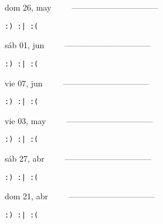 \documentclass[letterpaper,10pt]{article}
\begin{document}
\begin{multicols}{3}
{dom 26, may\ \ \ \ \ --------------------------------}
\begin{flushright}\begin{small}\texttt{:) :| :(}\end{small}\end{flushright}
\vfill
{sáb 01, jun\ \ \ \ \ --------------------------------}
\begin{flushright}\begin{small}\texttt{:) :| :(}\end{small}\end{flushright}\par
\vfill
{vie 07, jun\ \ \ \ \ --------------------------------}
\begin{flushright}\begin{small}\texttt{:) :| :(}\end{small}\end{flushright}\par
\vfill
\end{multicols}
\vspace{1.05cm}

\begin{multicols}{3}
{vie 03, may\ \ \ \ \ --------------------------------}
\begin{flushright}\begin{small}\texttt{:) :| :(}\end{small}\end{flushright}
\vfill
{sáb 27, abr\ \ \ \ \ --------------------------------}
\begin{flushright}\begin{small}\texttt{:) :| :(}\end{small}\end{flushright}\par
\vfill
{dom 21, abr\ \ \ \ \ --------------------------------}
\begin{flushright}\begin{small}\texttt{:) :| :(}\end{small}\end{flushright}\par
\vfill
\end{multicols}
\vspace{1.05cm}
\end{document}
